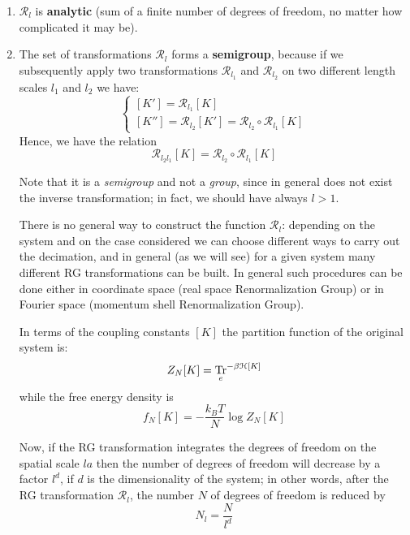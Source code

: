 \documentclass[../../Main/Main.tex]{subfiles}
\begin{document}
\begin{enumerate}
\item \( \mathcal{R}_l \) is \textbf{analytic} (sum of a finite number of degrees of freedom, no matter how complicated it may be).


\item The set of  transformations \( \mathcal{R}_l \) forms a \textbf{semigroup}, because if we subsequently apply two transformations \(\mathcal{R}_{l_1}  \) and \(\mathcal{R}_{l_2}  \) on two different length scales \( l_1 \)  and \( l_2 \) we have:
\begin{equation*}
  \begin{cases}
   [K'] = \mathcal{R}_{l_1} [K] \\
  [K''] = \mathcal{R}_{l_2} [K'] = \mathcal{R}_{l_2} \circ \mathcal{R}_{l_1} [K]
  \end{cases}
\end{equation*}
Hence, we have the relation
\begin{equation}
  \mathcal{R}_{l_2 l_1} [K] = \mathcal{R}_{l_2} \circ \mathcal{R}_{l_1} [K]
\end{equation}

\begin{remark}
Note that it is a \emph{semigroup} and not a \emph{group}, since in general does not exist the inverse transformation; in fact, we should have always \( l>1 \).
\end{remark}

There is no general way to construct the function \(  \mathcal{R}_l  \): depending on the system and on the case considered we can choose different ways to carry out the decimation, and in general (as we will see) for a given system many different RG transformations can be built. In general such procedures can be done either in coordinate space (real space Renormalization Group) or in Fourier space (momentum shell Renormalization Group).

In terms of the coupling constants \( [K] \) the partition function of the original system is:
\begin{equation*}
  Z_N [K] = \underset{e}{\text{Tr}}^{-\beta \mathcal{H}[K]}
\end{equation*}
while the free energy density is
 \begin{equation*}
   f_N [K] = - \frac{k_B T}{N} \log{Z_N [K]}
 \end{equation*}

 Now, if the RG transformation integrates the degrees of freedom on the spatial scale \( la \)  then the number of degrees of freedom will decrease by a factor \( l^d \), if \( d \) is the dimensionality of the system; in other words, after the RG transformation \( \mathcal{R}_l \), the number \( N \) of degrees of freedom is reduced by
\begin{equation*}
  N_l = \frac{N}{l^d}
\end{equation*}


\end{enumerate}
\end{document}
